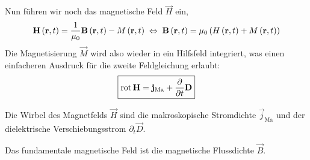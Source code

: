 Nun führen wir noch das magnetische Feld $\vec {H}$ ein,
\begin{equation*} 
	\mathbf{H}\left(\mathbf{r},t\right)=\frac{1}{\mu _{0}}\mathbf{B}\left(\mathbf{r},t\right)-M\left(\mathbf{r},t\right)\;\Leftrightarrow\; \mathbf{B}\left(\mathbf{r},t\right)=\mu _{0}\left(H\left(\mathbf{r},t\right)+M\left(\mathbf{r},t\right)\right)
\end{equation*}
Die Magnetisierung $\vec {M}$ wird also wieder in ein Hilfsfeld integriert, was einen einfacheren Ausdruck für die zweite Feldgleichung erlaubt:
\begin{equation*}
	\boxed{\operatorname{rot} \mathbf{H}=\mathbf{j}_{\mathrm{Ma}}+\frac{\partial }{\partial t}\mathbf{D}}
\end{equation*}

\begin{formal}
		Die Wirbel des Magnetfelds $\vec {H}$ sind die makroskopische Stromdichte $\vec {j}_{\mathrm{Ma}}$ und der dielektrische Verschiebungsstrom $\partial _{t}\vec {D}$.
\end{formal}

Das fundamentale magnetische Feld ist die magnetische Flussdichte $\vec {B}$.


